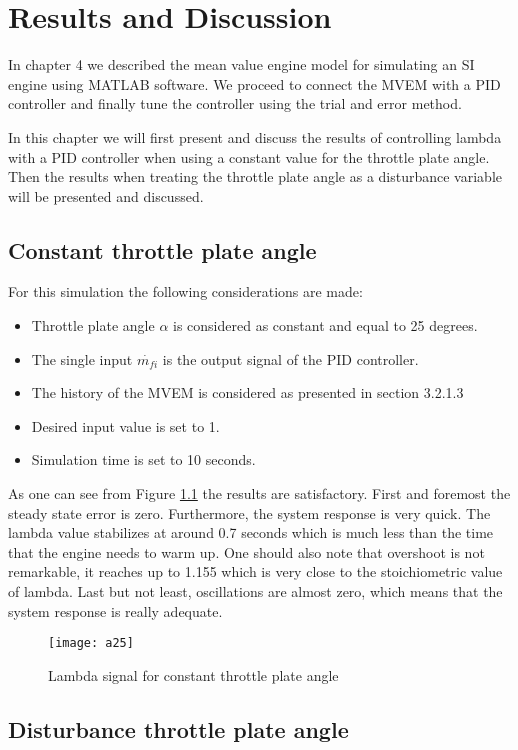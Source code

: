 \chapter{Results and Discussion}\label{ch:5}
In chapter 4 we described the mean value engine model for simulating an SI engine using MATLAB software. We proceed to connect the MVEM with a PID controller and finally tune the controller using the trial and error method. 

In this chapter we will first present and discuss the results of controlling lambda with a PID controller when using a constant value for the throttle plate angle. Then the results when treating the throttle plate angle as a disturbance variable will be presented and discussed.

\section{Constant throttle plate angle}
For this simulation the following considerations are made:
\begin{itemize}
	\item Throttle plate angle $\alpha$ is considered as constant and equal to 25 degrees.
	\item The single input $\dot{m_{fi}}$ is the output signal of the PID controller. 
	\item The history of the MVEM is considered as presented in section 3.2.1.3 
	\item Desired input value is set to 1.
	\item Simulation time is set to 10 seconds.
\end{itemize} 
As one can see from Figure \ref{fig:a25} the results are satisfactory. First and foremost the steady state error is zero. Furthermore, the system response is very quick. The lambda value stabilizes at around 0.7 seconds which is much less than the time that the engine needs to warm up. One should also note that overshoot is not remarkable, it reaches up to 1.155 which is very close to the stoichiometric value of lambda. Last but not least, oscillations are almost zero, which means that the system response is really adequate.

\begin{figure}[H]
    \centering
    \texttt{[image: a25]}
    \caption{Lambda signal for constant throttle plate angle}
    \label{fig:a25}
\end{figure}


\section{Disturbance throttle plate angle}

